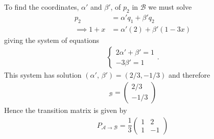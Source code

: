 {\noindent To find the coordinates, $\alpha'$ and $\beta'$, of $p_2$ in $\mathcal{B}$ we must solve
\begin{align*}
p_2 &= \alpha' q_1 + \beta' q_2 \\
\implies 1+x &= \alpha' (2) + \beta' (1-3x)
\end{align*}
giving the system of equations
\begin{align*}
\begin{cases}
2\alpha' + \beta' = 1 \\
-3\beta' = 1
\end{cases}.
\end{align*}
This system has solution $(\alpha',\,\beta')=(2/3,-1/3)$ and therefore
\begin{align*}
[\mathbf{p}_1]_\mathcal{B} = \begin{pmatrix} 2/3 \\ -1/3 \end{pmatrix}
\end{align*}
Hence the transition matrix is given by
\begin{align*}
P_{\mathcal{A}\to\mathcal{B}} =
\dfrac{1}{3}
\begin{pmatrix}
1 & 2 \\ 
1 & -1
\end{pmatrix}
\end{align*}
}



